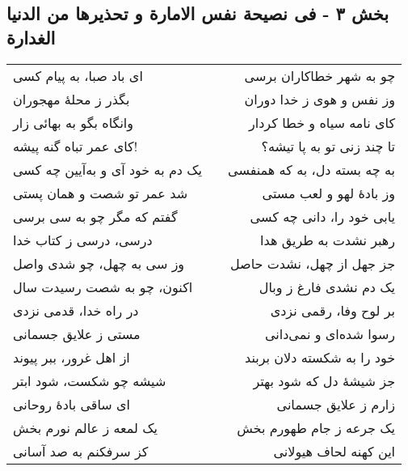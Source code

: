 \begin{center}
\section*{بخش ۳ - فی نصیحة نفس الامارة و تحذیرها من الدنیا الغدارة}
\label{sec:003}
\begin{longtable}{l p{0.5cm} r}
ای باد صبا، به پیام کسی
&&
چو به شهر خطاکاران برسی
\\
بگذر ز محلهٔ مهجوران
&&
وز نفس و هوی ز خدا دوران
\\
وانگاه بگو به بهائی زار
&&
کای نامه سیاه و خطا کردار
\\
کای عمر تباه گنه پیشه!
&&
تا چند زنی تو به پا تیشه؟
\\
یک دم به خود آی و به‌آیین چه کسی
&&
به چه بسته دل، به که همنفسی
\\
شد عمر تو شصت و همان پستی
&&
وز بادهٔ لهو و لعب مستی
\\
گفتم که مگر چو به سی برسی
&&
یابی خود را، دانی چه کسی
\\
درسی، درسی ز کتاب خدا
&&
رهبر نشدت به طریق هدا
\\
وز سی به چهل، چو شدی واصل
&&
جز جهل از چهل، نشدت حاصل
\\
اکنون، چو به شصت رسیدت سال
&&
یک دم نشدی فارغ ز وبال
\\
در راه خدا، قدمی نزدی
&&
بر لوح وفا، رقمی نزدی
\\
مستی ز علایق جسمانی
&&
رسوا شده‌ای و نمی‌دانی
\\
از اهل غرور، ببر پیوند
&&
خود را به شکسته دلان بربند
\\
شیشه چو شکست، شود ابتر
&&
جز شیشهٔ دل که شود بهتر
\\
ای ساقی بادهٔ روحانی
&&
زارم ز علایق جسمانی
\\
یک لمعه ز عالم نورم بخش
&&
یک جرعه ز جام طهورم بخش
\\
کز سرفکنم به صد آسانی
&&
این کهنه لحاف هیولانی
\\
\end{longtable}
\end{center}
